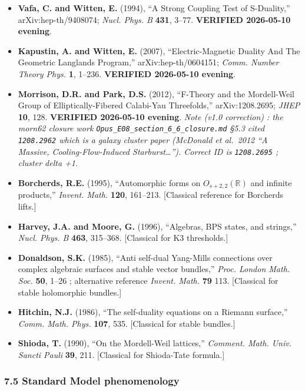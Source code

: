 \documentclass[
  11pt,
  a4paper,
]{article}
\begin{document}
\begin{itemize}
\item
  \textbf{Vafa, C. and Witten, E.} (1994), ``A Strong Coupling Test of S-Duality,'' arXiv:hep-th/9408074; \emph{Nucl. Phys. B} \textbf{431}, 3--77. \textbf{VERIFIED 2026-05-10 evening}.
\item
  \textbf{Kapustin, A. and Witten, E.} (2007), ``Electric-Magnetic Duality And The Geometric Langlands Program,'' arXiv:hep-th/0604151; \emph{Comm. Number Theory Phys.} \textbf{1}, 1--236. \textbf{VERIFIED 2026-05-10 evening}.
\item
  \textbf{Morrison, D.R. and Park, D.S.} (2012), ``F-Theory and the Mordell-Weil Group of Elliptically-Fibered Calabi-Yau Threefolds,'' arXiv:1208.2695; \emph{JHEP} \textbf{10}, 128. \textbf{VERIFIED 2026-05-10 evening}. \emph{Note (v1.0 correction) : the morn62 closure work \texttt{Opus\_E08\_section\_6\_6\_closure.md} §5.3 cited \texttt{1208.2962} which is a galaxy cluster paper (McDonald et al.~2012 ``A Massive, Cooling-Flow-Induced Starburst\ldots{}''). Correct ID is \texttt{1208.2695} ; cluster delta +1.}
\item
  \textbf{Borcherds, R.E.} (1995), ``Automorphic forms on \(O_{s+2,2}(\mathbb{R})\) and infinite products,'' \emph{Invent. Math.} \textbf{120}, 161--213. {[}Classical reference for Borcherds lifts.{]}
\item
  \textbf{Harvey, J.A. and Moore, G.} (1996), ``Algebras, BPS states, and strings,'' \emph{Nucl. Phys. B} \textbf{463}, 315--368. {[}Classical for K3 thresholds.{]}
\item
  \textbf{Donaldson, S.K.} (1985), ``Anti self-dual Yang-Mills connections over complex algebraic surfaces and stable vector bundles,'' \emph{Proc. London Math. Soc.} \textbf{50}, 1--26 ; alternative reference \emph{Invent. Math.} \textbf{79} 113. {[}Classical for stable holomorphic bundles.{]}
\item
  \textbf{Hitchin, N.J.} (1986), ``The self-duality equations on a Riemann surface,'' \emph{Comm. Math. Phys.} \textbf{107}, 535. {[}Classical for stable bundles.{]}
\item
  \textbf{Shioda, T.} (1990), ``On the Mordell-Weil lattices,'' \emph{Comment. Math. Univ. Sancti Pauli} \textbf{39}, 211. {[}Classical for Shioda-Tate formula.{]}
\end{itemize}

\hypertarget{standard-model-phenomenology}{%
\subsubsection{7.5 Standard Model phenomenology}\label{standard-model-phenomenology}}
\end{document}
